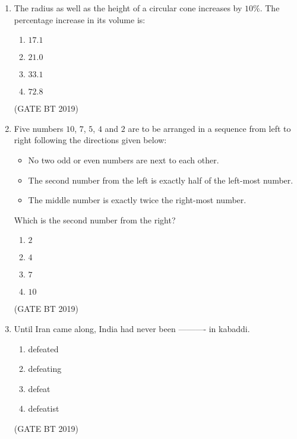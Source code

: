 \documentclass[journal,12pt,onecolumn]{IEEEtran}
\begin{document}
\begin{enumerate}
    \item The radius as well as the height of a circular cone increases by $10\%$. The percentage increase in its volume is:
    \begin{multicols}{4}
    \begin{enumerate}
        \item $17.1$  
        \item $21.0$  
        \item $33.1$  
        \item $72.8$  
    \end{enumerate}
    \end{multicols}\hfill(GATE BT 2019)

    \item Five numbers $10$, $7$, $5$, $4$ and $2$ are to be arranged in a sequence from left to right following the directions given below:
    \begin{itemize}
        \item No two odd or even numbers are next to each other.  
        \item The second number from the left is exactly half of the left-most number.  
        \item The middle number is exactly twice the right-most number.  
    \end{itemize}
    Which is the second number from the right?
    \begin{multicols}{4}
    \begin{enumerate}
        \item $2$  
        \item $4$  
        \item $7$  
        \item $10$  
    \end{enumerate}
    \end{multicols}\hfill(GATE BT 2019)

    \item Until Iran came along, India had never been ---------- in kabaddi.
    \begin{multicols}{4}
    \begin{enumerate}
        \item defeated  
        \item defeating  
        \item defeat  
        \item defeatist  
    \end{enumerate}
    \end{multicols}\hfill(GATE BT 2019)



\end{enumerate}
\end{document}
